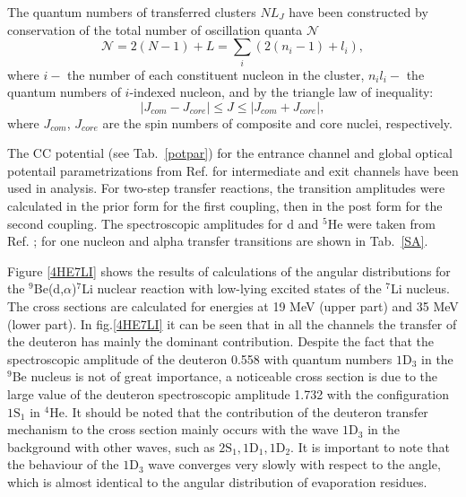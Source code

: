 \documentclass[10pt]{iopart}
\begin{document}
The quantum numbers of transferred clusters $NL_J$ have been constructed by conservation of the total number of oscillation quanta $\mathcal{N}$ \cite{satchler1983}
\begin{equation}
\mathcal{N} =2(N-1)+L=\sum_{i} \left( 2 \left( n_i -1 \right) + l_i \right),
\end{equation}
where $i -$ the number of each constituent nucleon in the cluster, $n_i l_i -$ the quantum numbers of $i$-indexed nucleon,
and by the triangle law of inequality:
\begin{equation}
\vert {J}_{com} - {J}_{core} \vert \le {J} \le \vert {J}_{com} + {J}_{core} \vert,
\end{equation}
where $J_{com}$, $J_{core}$ are the spin numbers of composite and core nuclei, respectively. 

 The CC potential (see Tab.~\ref{potpar}) for the entrance channel and global optical potentail parametrizations from Ref. \cite{globalTriton, globalAlpha, global6Li} for intermediate and exit channels have been used in analysis. For two-step transfer reactions, the transition amplitudes were calculated in the prior form for the first coupling, then in the post form for the second coupling. The spectroscopic amplitudes for d and $^5$He were taken from Ref. \cite{fiveSA}; for one nucleon and alpha transfer transitions are shown in Tab.~\ref{SA}.
 
 
Figure \ref{4HE7LI} shows the results of calculations of the angular distributions  for the $^9$Be(d,$\alpha$)$^7$Li nuclear reaction with low-lying excited states of the $^7$Li nucleus. The cross sections are calculated for energies at 19 MeV (upper part) and 35 MeV (lower part). In fig.\ref{4HE7LI}  it can be seen that in all the channels the transfer of the deuteron  has mainly the dominant contribution. Despite the fact that the spectroscopic amplitude of the deuteron 0.558 with quantum numbers ${1\textrm{D}_3}$ \cite{bodek1989} in the $^9$Be nucleus is not of great importance, a noticeable cross section is due to the large value of the deuteron spectroscopic amplitude  1.732 with the configuration ${1\textrm{S}_1}$ in $^4$He. It should be noted that the contribution of the deuteron transfer mechanism to the cross section mainly occurs with the wave ${1\textrm{D}_3}$ in the background with other waves, such as ${2\textrm{S}_1}, 1\textrm{D}_1, 1\textrm{D}_2$. It is important to note that the behaviour of the ${1\textrm{D}_3}$ wave converges very slowly with respect to the angle, which is almost identical to the angular distribution of evaporation residues.
\end{document}

